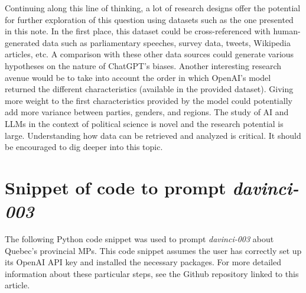 \documentclass{article}
\begin{document}
Continuing along this line of thinking, a lot of research designs offer the potential for further exploration of this question using datasets such as the one presented in this note. In the first place, this dataset could be cross-referenced with human-generated data such as parliamentary speeches, survey data, tweets, Wikipedia articles, etc. A comparison with these other data sources could generate various hypotheses on the nature of ChatGPT's biases. Another interesting research avenue would be to take into account the order in which OpenAI's model returned the different characteristics (available in the provided dataset). Giving more weight to the first characteristics provided by the model could potentially add more variance between parties, genders, and regions. The study of AI and LLMs in the context of political science is novel and the research potential is large. Understanding how data can be retrieved and analyzed is critical. It should be encouraged to dig deeper into this topic.

\newpage
\printbibliography


\appendix

\newpage
\section{Snippet of code to prompt \textit{davinci-003}}
\label{appendix:codesnippet}

The following Python code snippet was used to prompt \textit{davinci-003} about Quebec's provincial MPs. This code snippet assumes the user has correctly set up its OpenAI API key and installed the necessary packages. For more detailed information about these particular steps, see the Github repository linked to this article.
\end{document}
